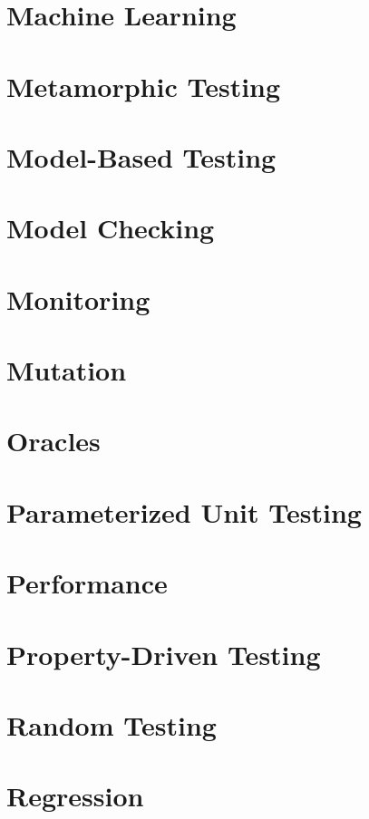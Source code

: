 \chapter{Machine Learning}

\chapter{Metamorphic Testing}

\chapter{Model-Based Testing}

\chapter{Model Checking}

\chapter{Monitoring}

\chapter{Mutation}

\chapter{Oracles}

\chapter{Parameterized Unit Testing}

\chapter{Performance}

\chapter{Property-Driven Testing}

\chapter{Random Testing}

\chapter{Regression}

